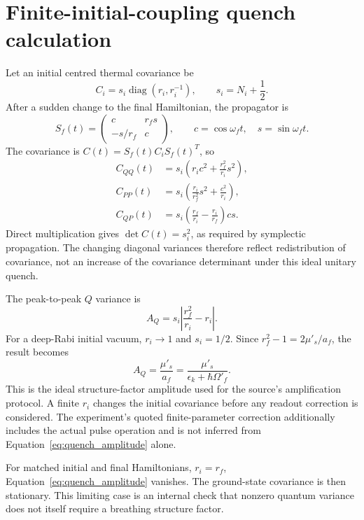 \documentclass[11pt,a4paper]{article}
\theoremstyle{definition}
\theoremstyle{remark}
\newcommand{\diag}{\operatorname{diag}}
\newcommand{\musp}{\mu'_s}
\begin{document}
\appendix
\section{Finite-initial-coupling quench calculation}
\label{app:quench}
Let an initial centred thermal covariance be
\begin{equation}
 C_i=s_i\diag(r_i,r_i^{-1}),\qquad s_i=N_i+\frac12.
 \label{eq:Ci}
\end{equation}
After a sudden change to the final Hamiltonian, the propagator is
\begin{equation}
 S_f(t)=\begin{pmatrix}
 c&r_fs\\-s/r_f&c
 \end{pmatrix},\qquad
 c=\cos\omega_ft,\quad s=\sin\omega_ft.
 \label{eq:Sf}
\end{equation}
The covariance is $C(t)=S_f(t)C_iS_f(t)^T$, so
\begin{align}
 C_{QQ}(t)&=s_i\left(r_ic^2+\frac{r_f^2}{r_i}s^2\right),\nonumber\\
 C_{PP}(t)&=s_i\left(\frac{r_i}{r_f^2}s^2+\frac{c^2}{r_i}\right),\nonumber\\
 C_{QP}(t)&=s_i\left(\frac{r_f}{r_i}-\frac{r_i}{r_f}\right)cs.
 \label{eq:quench_covariance}
\end{align}
Direct multiplication gives $\det C(t)=s_i^2$, as required by symplectic propagation. The changing diagonal variances therefore reflect redistribution of covariance, not an increase of the covariance determinant under this ideal unitary quench.

The peak-to-peak $Q$ variance is
\begin{equation}
 A_Q=s_i\left|\frac{r_f^2}{r_i}-r_i\right|.
 \label{eq:quench_amplitude}
\end{equation}
For a deep-Rabi initial vacuum, $r_i\to1$ and $s_i=1/2$. Since $r_f^2-1=2\musp/a_f$, the result becomes
\begin{equation}
 A_Q=\frac{\musp}{a_f}
 =\frac{\musp}{\epsilon_k+\hbar\Omega'_f}.
 \label{eq:quench_source}
\end{equation}
This is the ideal structure-factor amplitude used for the source's amplification protocol. A finite $r_i$ changes the initial covariance before any readout correction is considered. The experiment's quoted finite-parameter correction additionally includes the actual pulse operation and is not inferred from Equation~\eqref{eq:quench_amplitude} alone.\cite{zhang2026}

For matched initial and final Hamiltonians, $r_i=r_f$, Equation~\eqref{eq:quench_amplitude} vanishes. The ground-state covariance is then stationary. This limiting case is an internal check that nonzero quantum variance does not itself require a breathing structure factor.
\end{document}

